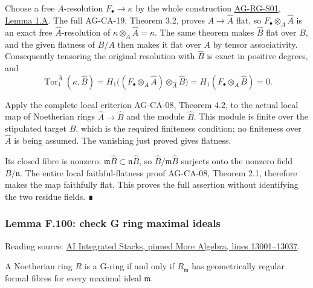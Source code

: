 \documentclass[11pt,a4paper,openany]{report}
\begin{document}
Choose a free \(A\)-resolution \(F_\bullet\to\kappa\) by the whole construction \href{https://github.com/KokunoYumeto/open-math-courses/blob/main/docs/courses/AG-RG/AG-RG-S01.md}{AG-RG-S01, Lemma 1.A}. The full AG-CA-19, Theorem 3.2, proves \(A\to\widehat A\) flat, so \(F_\bullet\otimes_A\widehat A\) is an exact free \(\widehat A\)-resolution of \(\kappa\otimes_A\widehat A=\kappa\). The same theorem makes \(\widehat B\) flat over \(B\), and the given flatness of \(B/A\) then makes it flat over \(A\) by tensor associativity. Consequently tensoring the original resolution with \(\widehat B\) is exact in positive degrees, and \[
\operatorname{Tor}^{\widehat A}_1(\kappa,\widehat B)
=H_1\bigl((F_\bullet\otimes_A\widehat A)
\otimes_{\widehat A}\widehat B\bigr)
=H_1(F_\bullet\otimes_A\widehat B)=0.
\]

Apply the complete local criterion AG-CA-08, Theorem 4.2, to the actual local map of Noetherian rings \(\widehat A\to\widehat B\) and the module \(\widehat B\). This module is finite over the stipulated target \(\widehat B\), which is the required finiteness condition; no finiteness over \(\widehat A\) is being assumed. The vanishing just proved gives flatness.

Its closed fibre is nonzero: \(\mathfrak m\widehat B\subset\mathfrak n\widehat B\), so \(\widehat B/\mathfrak m\widehat B\) surjects onto the nonzero field \(B/\mathfrak n\). The entire local faithful-flatness proof AG-CA-08, Theorem 2.1, therefore makes the map faithfully flat. This proves the full assertion without identifying the two residue fields. ∎

\label{AG-RG-S05-more-algebra-lemma-check-G-ring-maximal-ideals}

\subsubsection{Lemma F.100: check G ring maximal ideals}\label{AG-RG-S05-lemma-f.100-check-g-ring-maximal-ideals}

Reading source: \href{https://github.com/KokunoYumeto/unofficial-stacks-project-ai-drafts/blob/565b10e987aba5969b21145a0833f42d69f96790/more-algebra.tex\#L13001-L13037}{AI Integrated Stacks, pinned More Algebra, lines 13001--13037}.

A Noetherian ring \(R\) is a G-ring if and only if \(R_{\mathfrak m}\) has geometrically regular formal fibres for every maximal ideal \(\mathfrak m\).
\end{document}
